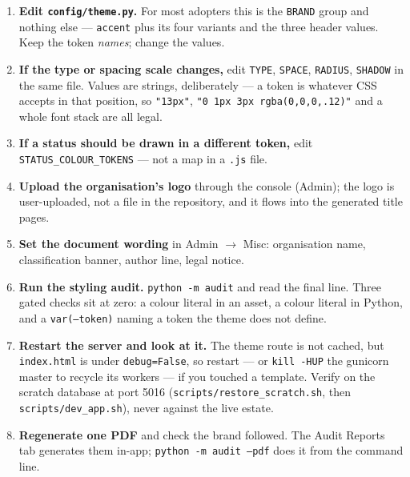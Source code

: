 \documentclass[11pt]{article}
\begin{document}
\begin{enumerate}
  \item \textbf{Edit \texttt{config/theme.py}.} For most adopters this is the
        \texttt{BRAND} group and nothing else --- \texttt{accent} plus its four variants
        and the three header values. Keep the token \emph{names}; change the values.
  \item \textbf{If the type or spacing scale changes,} edit \texttt{TYPE}, \texttt{SPACE},
        \texttt{RADIUS}, \texttt{SHADOW} in the same file. Values are strings, deliberately
        --- a token is whatever CSS accepts in that position, so \texttt{"13px"},
        \texttt{"0 1px 3px rgba(0,0,0,.12)"} and a whole font stack are all legal.
  \item \textbf{If a status should be drawn in a different token,} edit
        \texttt{STATUS\_COLOUR\_TOKENS} --- not a map in a \texttt{.js} file.
  \item \textbf{Upload the organisation's logo} through the console (Admin); the logo is
        user-uploaded, not a file in the repository, and it flows into the generated
        title pages.
  \item \textbf{Set the document wording} in Admin \(\rightarrow\) Misc: organisation name,
        classification banner, author line, legal notice.
  \item \textbf{Run the styling audit.} \texttt{python -m audit} and read the final line.
        Three gated checks sit at zero: a colour literal in an asset, a colour literal in
        Python, and a \texttt{var(--token)} naming a token the theme does not define.
  \item \textbf{Restart the server and look at it.} The theme route is not cached, but
        \texttt{index.html} is under \texttt{debug=False}, so restart --- or
        \texttt{kill -HUP} the gunicorn master to recycle its workers --- if you touched a
        template. Verify on the scratch database at port 5016
        (\texttt{scripts/restore\_scratch.sh}, then \texttt{scripts/dev\_app.sh}), never
        against the live estate.
  \item \textbf{Regenerate one PDF} and check the brand followed. The Audit Reports tab
        generates them in-app; \texttt{python -m audit --pdf} does it from the command line.
\end{enumerate}
\end{document}
